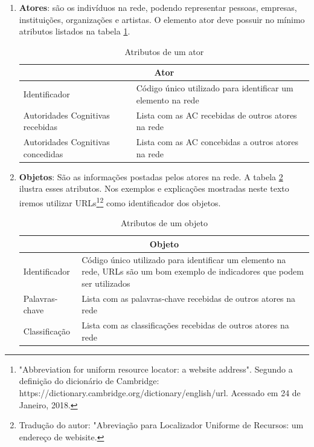 \begin{enumerate}
    \item \textbf{Atores}: são os indivíduos na rede, podendo representar pessoas, empresas, instituições, organizações e artistas. O elemento ator deve possuir no mínimo atributos listados na tabela \ref{tab:atributos_ator}.
    \begin{center}
        \begin{table}[!htp]
            \centering
            \caption{Atributos de um ator}
            \label{tab:atributos_ator}
            \begin{tabular}{|p{4cm}|p{10cm}|}
                \cline{1-2}
                \multicolumn{2}{|c|}{Ator}  \\
                \hline
                Identificador & Código único utilizado para identificar um elemento na rede\\
                \hline
                Autoridades Cognitivas recebidas & Lista com as AC recebidas de outros atores na rede\\
                \hline
                Autoridades Cognitivas concedidas & Lista com as AC concebidas a outros atores na rede\\
                \hline
            \end{tabular}
        \end{table}    
    \end{center}
    
    
    \item \textbf{Objetos}: São as informações postadas pelos atores na rede. A tabela \ref{tab:atributos_objeto} ilustra esses atributos. Nos exemplos e explicações mostradas neste texto iremos utilizar URLs\footnote{"Abbreviation for uniform resource locator: a website address". Segundo a definição do dicionário de Cambridge: https://dictionary.cambridge.org/dictionary/english/url. Acessado em 24 de Janeiro, 2018.}\footnote{Tradução do autor: "Abreviação para Localizador Uniforme de Recursos: um endereço de webisite.} como identificador dos objetos. 
    \begin{center}
        \begin{table}[!htp]
            \centering
            \caption{Atributos de um objeto}
            \label{tab:atributos_objeto}
            \begin{tabular}{|p{4cm}|p{10cm}|}
                \cline{1-2}
                \multicolumn{2}{|c|}{Objeto}  \\
                \hline
                Identificador & Código único utilizado para identificar um elemento na rede, URLs são um bom exemplo de indicadores que podem ser utilizados\\
                \hline
                Palavras-chave & Lista com as palavras-chave recebidas de outros atores na rede\\
                \hline
                Classificação & Lista com as classificações recebidas de outros atores na rede\\
                \hline
            \end{tabular}
        \end{table}    
    \end{center}
    

\end{enumerate}
